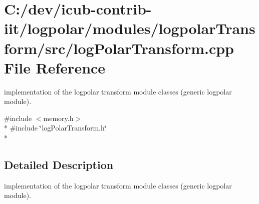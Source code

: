 \section{C\+:/dev/icub-\/contrib-\/iit/logpolar/modules/logpolar\+Transform/src/log\+Polar\+Transform.cpp File Reference}
\label{logPolarTransform_8cpp}


implementation of the logpolar transform module classes (generic logpolar module).  


{\ttfamily \#include $<$memory.\+h$>$}\\*
{\ttfamily \#include \char`\"{}log\+Polar\+Transform.\+h\char`\"{}}\\*


\subsection{Detailed Description}
implementation of the logpolar transform module classes (generic logpolar module). 

